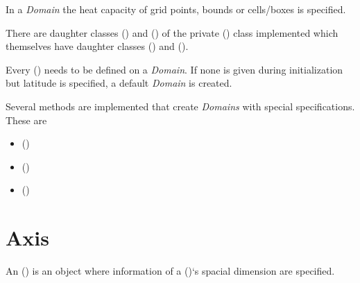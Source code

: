 \documentclass[a4paper,10pt,english]{sphinxmanual}
\begin{document}
In a \emph{Domain} the heat capacity of grid points, bounds or cells/boxes is specified.

There are daughter classes {\hyperref[api/climlab.domain:climlab.domain.domain.Atmosphere]{\emph{}}} () and {\hyperref[api/climlab.domain:climlab.domain.domain.Ocean]{\emph{}}} () of the private {\hyperref[api/climlab.domain:climlab.domain.domain._Domain]{\emph{}}} () class implemented which themselves have daughter classes {\hyperref[api/climlab.domain:climlab.domain.domain.SlabAtmosphere]{\emph{}}} () and {\hyperref[api/climlab.domain:climlab.domain.domain.SlabOcean]{\emph{}}} ().

Every {\hyperref[api/climlab.process:climlab.process.process.Process]{\emph{}}} () needs to be defined on a \emph{Domain}. If none is given during initialization but latitude  is specified, a default \emph{Domain} is created.

Several methods are implemented that create \emph{Domains} with special specifications. These are
\begin{itemize}
\item {} 
{\hyperref[api/climlab.domain:climlab.domain.domain.single_column]{\emph{}}} ()

\item {} 
{\hyperref[api/climlab.domain:climlab.domain.domain.zonal_mean_column]{\emph{}}} ()

\item {} 
{\hyperref[api/climlab.domain:climlab.domain.domain.box_model_domain]{\emph{}}} ()

\end{itemize}


\section{Axis}
\label{architecture:axis}
An {\hyperref[api/climlab.domain:climlab.domain.axis.Axis]{\emph{}}} () is an object where information of a {\hyperref[api/climlab.domain:climlab.domain.domain._Domain]{\emph{}}} ()`s spacial dimension are specified.
\end{document}
